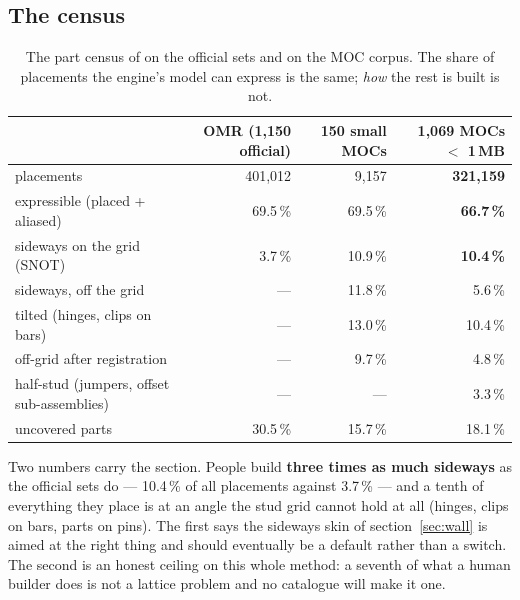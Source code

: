 \subsection{The census}
\begin{table}[H]
\centering\small
\begin{tabular}{lrrr}
\toprule
 & OMR (1,150 official) & 150 small MOCs & \textbf{1,069 MOCs $<$ 1\,MB} \\
\midrule
placements & 401,012 & 9,157 & \textbf{321,159} \\
expressible (placed + aliased) & 69.5\,\% & 69.5\,\% & \textbf{66.7\,\%} \\
sideways on the grid (SNOT) & 3.7\,\% & 10.9\,\% & \textbf{10.4\,\%} \\
sideways, off the grid & --- & 11.8\,\% & 5.6\,\% \\
tilted (hinges, clips on bars) & --- & 13.0\,\% & 10.4\,\% \\
off-grid after registration & --- & 9.7\,\% & 4.8\,\% \\
half-stud (jumpers, offset sub-assemblies) & --- & --- & 3.3\,\% \\
uncovered parts & 30.5\,\% & 15.7\,\% & 18.1\,\% \\
\bottomrule
\end{tabular}
\caption{The part census of  on the official sets and on the MOC corpus. The share of placements the
engine's model can express is the same; \emph{how} the rest is built is not.}
\end{table}

Two numbers carry the section. People build \textbf{three times as much sideways} as the official sets do --- 10.4\,\% of all
placements against 3.7\,\% --- and a tenth of everything they place is at an angle the stud grid cannot hold at all (hinges, clips
on bars, parts on pins). The first says the sideways skin of section~\ref{sec:wall} is aimed at the right thing and should
eventually be a default rather than a switch. The second is an honest ceiling on this whole method: a seventh of what a human
builder does is not a lattice problem and no catalogue will make it one.

